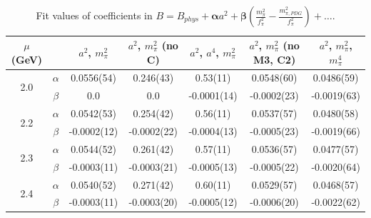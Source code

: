 \documentclass[12pt]{extarticle}
\begin{document}
\begin{table}[h!]
\begin{center}
\begin{tabular}{|c c|c|c|c|c|c|}
\hline
$\mu$ (GeV) &  & $a^2$, $m_\pi^2$& $a^2$, $m_\pi^2$ (no C)& $a^2$, $a^4$, $m_\pi^2$& $a^2$, $m_\pi^2$ (no M3, C2)& $a^2$, $m_\pi^2$, $m_\pi^4$\\
\hline
\multirow{2}{0.5in}{2.0} & $\alpha$ & 0.0556(54)& 0.246(43)& 0.53(11)& 0.0548(60)& 0.0486(59)\\
 & $\beta$ & 0.0& 0.0& -0.0001(14)& -0.0002(23)& -0.0019(63)\\
\hline
\multirow{2}{0.5in}{2.2} & $\alpha$ & 0.0542(53)& 0.254(42)& 0.56(11)& 0.0537(57)& 0.0480(58)\\
 & $\beta$ & -0.0002(12)& -0.0002(22)& -0.0004(13)& -0.0005(23)& -0.0019(66)\\
\hline
\multirow{2}{0.5in}{2.3} & $\alpha$ & 0.0544(52)& 0.261(42)& 0.57(11)& 0.0536(57)& 0.0477(57)\\
 & $\beta$ & -0.0003(11)& -0.0003(21)& -0.0005(13)& -0.0005(22)& -0.0020(64)\\
\hline
\multirow{2}{0.5in}{2.4} & $\alpha$ & 0.0540(52)& 0.271(42)& 0.60(11)& 0.0529(57)& 0.0468(57)\\
 & $\beta$ & -0.0003(11)& -0.0003(20)& -0.0005(12)& -0.0006(20)& -0.0022(62)\\
\hline
\end{tabular}
\caption{Fit values of coefficients in $B = B_{phys} + \mathbf{\alpha} a^2 + \mathbf{\beta}\left(\frac{m_\pi^2}{f_\pi^2}-\frac{m_{\pi,PDG}^2}{f_\pi^2}\right) + \ldots$.}
\end{center}
\end{table}




















\clearpage
\end{document}
